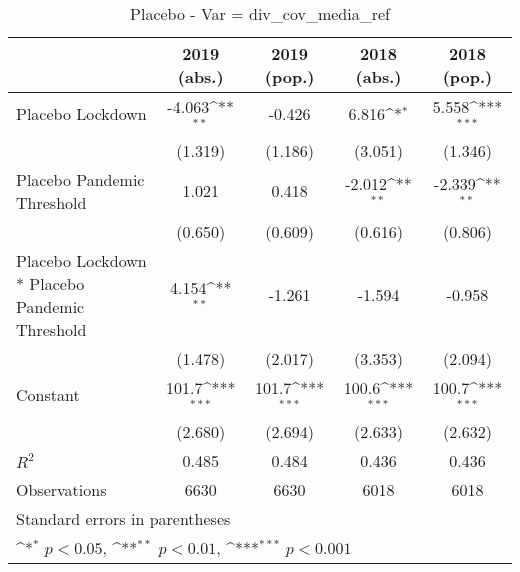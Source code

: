 \documentclass{article}
\begin{document}
{
\def\sym#1{\ifmmode^{#1}\else\(^{#1}\)\fi}
\begin{longtable}{l*{4}{c}}
\caption{Placebo - Var = div\_cov\_media\_ref}\\
\hline\hline\endfirsthead\hline\endhead\hline\endfoot\endlastfoot
                &\multicolumn{1}{c}{2019 (abs.)}&\multicolumn{1}{c}{2019 (pop.)}&\multicolumn{1}{c}{2018 (abs.)}&\multicolumn{1}{c}{2018 (pop.)}\\
\hline
Placebo Lockdown&   -4.063\sym{**} &   -0.426         &    6.816\sym{*}  &    5.558\sym{***}\\
                &  (1.319)         &  (1.186)         &  (3.051)         &  (1.346)         \\
Placebo Pandemic Threshold&    1.021         &    0.418         &   -2.012\sym{**} &   -2.339\sym{**} \\
                &  (0.650)         &  (0.609)         &  (0.616)         &  (0.806)         \\
Placebo Lockdown * Placebo Pandemic Threshold&    4.154\sym{**} &   -1.261         &   -1.594         &   -0.958         \\
                &  (1.478)         &  (2.017)         &  (3.353)         &  (2.094)         \\
Constant        &    101.7\sym{***}&    101.7\sym{***}&    100.6\sym{***}&    100.7\sym{***}\\
                &  (2.680)         &  (2.694)         &  (2.633)         &  (2.632)         \\
\hline
\(R^{2}\)       &    0.485         &    0.484         &    0.436         &    0.436         \\
Observations    &     6630         &     6630         &     6018         &     6018         \\
\hline\hline
\multicolumn{5}{l}{\footnotesize Standard errors in parentheses}\\
\multicolumn{5}{l}{\footnotesize \sym{*} \(p<0.05\), \sym{**} \(p<0.01\), \sym{***} \(p<0.001\)}\\
\end{longtable}
}
\end{document}
